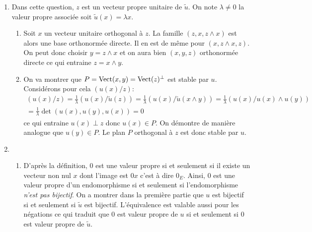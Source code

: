 \begin{enumerate}
 \item Dans cette question, $z$ est un vecteur propre unitaire de $\widetilde{u}$. On note $\lambda\neq 0$ la valeur propre associée soit
$\widetilde{u}(x)=\lambda x$.
\begin{enumerate}
 \item Soit $x$ un vecteur unitaire orthogonal à $z$. La famille $(z,x,z\wedge x)$ est alors une base orthonormée directe. Il en est de même pour $(x,z\wedge x, z)$. On peut donc choisir $y=z\wedge x$ et on aura bien $(x,y,z)$ orthonormée directe ce qui entraine $z=x\wedge y$.
 \item On va montrer que $P=\operatorname{Vect}(x,y)=\operatorname{Vect}(z)^{\perp}$ est stable par $u$. Considérons pour cela $(u(x)/z)$:
\begin{multline*}
 (u(x)/z) = \frac{1}{\lambda}(u(x)/\widetilde{u}(z))
=\frac{1}{\lambda}(u(x)/\widetilde{u}(x\wedge y))
=\frac{1}{\lambda}(u(x)/u(x)\wedge u(y))\\
=\frac{1}{\lambda}\det(u(x),u(y),u(x))=0
\end{multline*}
ce qui entraine $u(x) \perp z$ donc $u(x)\in P$. On démontre de manière analogue que $u(y)\in P$. Le plan $P$ orthogonal à $z$ est donc stable par $u$.
\end{enumerate}

 \item 
\begin{enumerate}
 \item D'après la définition, $0$ est une valeur propre si et seulement si il existe un vecteur non nul $x$ dont l'image est $0x$ c'est à dire $0_E$. Ainsi, $0$ est une valeur propre d'un endomorphisme si et seulement si l'endomorphisme \emph{n'est pas bijectif}. On a montrer dans la première partie que $u$ est bijectif si et seulement si $\widetilde{u}$ est bijectif. L'équivalence est valable aussi pour les négations ce qui traduit que $0$ est valeur propre de $u$ si et seulement si $0$ est valeur propre de $\widetilde{u}$.


\end{enumerate}
\end{enumerate}
